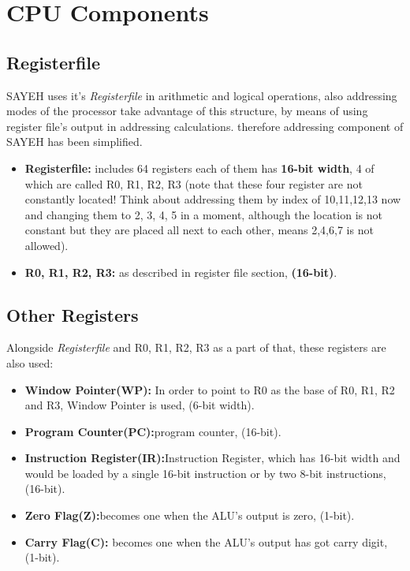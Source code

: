 \documentclass{report}
\begin{document}
\section{CPU Components}
\subsection{Registerfile}
\par
SAYEH uses it’s \textit{Registerfile} in arithmetic and logical
operations, also addressing modes of the processor take
advantage of this structure, by means of using register file’s
output in addressing calculations. therefore addressing
component of SAYEH has been simplified.

\begin{itemize}
	\item \textbf{Registerfile:} includes 64 registers each of them has  \textbf{16-bit width},
		4 of which are called R0, R1, R2, R3 (note that these four register are not constantly located!
		Think about addressing them by index of 10,11,12,13 now and changing them to 2, 3, 4, 5 in a moment,
		although the location is not constant but they are placed all next to each other, means 2,4,6,7 is not allowed).
	\item \textbf{R0, R1, R2, R3:} as described in register file section, \textbf{(16-bit)}.
\end{itemize}


\subsection{Other Registers}
\par
Alongside \textit{Registerfile} and R0, R1, R2, R3 as a part of that, these registers are also used:

\begin{itemize}
	\item \textbf{Window Pointer(WP):} In order to point to R0 as the base of R0, R1, R2 and R3, Window Pointer is used, (6-bit width).
	\item \textbf{Program Counter(PC):}program counter, (16-bit).
	\item \textbf{Instruction Register(IR):}Instruction Register, which has 16-bit width and would be loaded by a single 16-bit
		instruction or by two 8-bit instructions, (16-bit).
	\item \textbf{Zero Flag(Z):}becomes one when the ALU’s output is zero, (1-bit).
	\item \textbf{Carry Flag(C):} becomes one when the ALU’s output has got carry digit, (1-bit).
\end{itemize}
\end{document}
